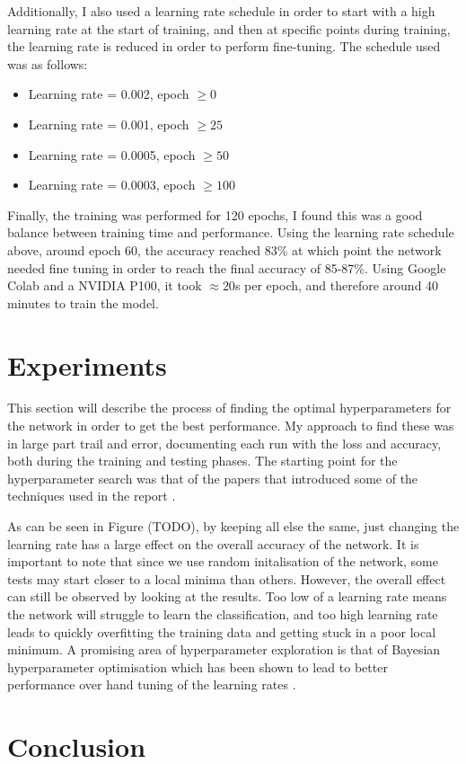 \documentclass[12pt]{article}
\begin{document}

Additionally, I also used a learning rate schedule in order to start with a high learning rate at the start of training, and then at specific points during training, the learning rate is reduced in order to perform fine-tuning. The schedule used was as follows:

\begin{itemize}
  \item Learning rate = 0.002, epoch $\geq 0$
  \item Learning rate = 0.001, epoch $\ge 25$
  \item Learning rate = 0.0005, epoch $\ge 50$
  \item Learning rate = 0.0003, epoch $\ge 100$
\end{itemize}

Finally, the training was performed for 120 epochs, I found this was a good balance between training time and performance. Using the learning rate schedule above, around epoch 60, the accuracy reached 83\% at which point the network needed fine tuning in order to reach the final accuracy of 85-87\%. Using Google Colab and a NVIDIA P100, it took $\approx 20$s per epoch, and therefore around 40 minutes to train the model.



\section{Experiments}
This section will describe the process of finding the optimal hyperparameters for the network in order to get the best performance. My approach to find these was in large part trail and error, documenting each run with the loss and accuracy, both during the training and testing phases. The starting point for the hyperparameter search was that of the papers that introduced some of the techniques used in the report \cite{simonyan2014deep}.

As can be seen in Figure (TODO), by keeping all else the same, just changing the learning rate has a large effect on the overall accuracy of the network. It is important to note that since we use random initalisation of the network, some tests may start closer to a local minima than others. However, the overall effect can still be observed by looking at the results. Too low of a learning rate means the network will struggle to learn the classification, and too high learning rate leads to quickly overfitting the training data and getting stuck in a poor local minimum. A promising area of hyperparameter exploration is that of Bayesian hyperparameter optimisation which has been shown to lead to better performance over hand tuning of the learning rates \cite{snoek2012practical, bayesian-optim}.

\section{Conclusion}



\end{document}
